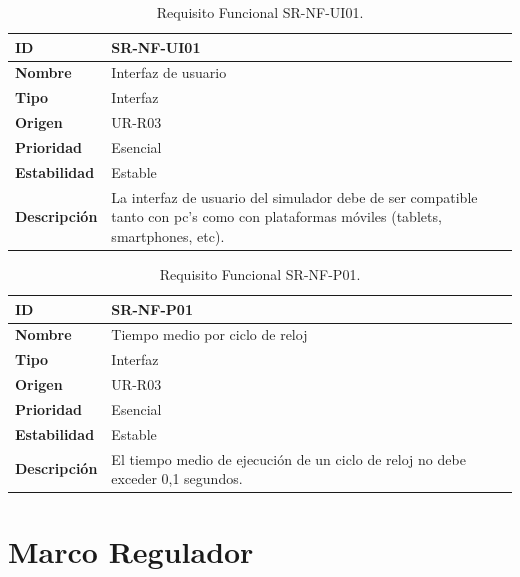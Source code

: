 \begin{center}
\begin{table}[htbp]
\centering
\begin{tabular}{@{}p{2.5cm} p{9cm}@{}} 
\toprule
\textbf{ID} 				& SR-NF-UI01 \\
\midrule
\textbf{Nombre} 			& Interfaz de usuario \\
\midrule
\textbf{Tipo} 			& Interfaz \\
\midrule
\textbf{Origen} 			& UR-R03 \\
\midrule
\textbf{Prioridad}		& Esencial \\
\midrule
\textbf{Estabilidad} 		& Estable \\
\midrule
\textbf{Descripción} 	& La interfaz de usuario del simulador debe de ser compatible tanto con pc's como con plataformas móviles (tablets, smartphones, etc). \\
\bottomrule
\end{tabular}
\caption{Requisito Funcional SR-NF-UI01.}
\label{tab:srnfui01}
\end{table}
\end{center}

\begin{center}
\begin{table}[htbp]
\centering
\begin{tabular}{@{}p{2.5cm} p{9cm}@{}} 
\toprule
\textbf{ID} 				& SR-NF-P01 \\
\midrule
\textbf{Nombre} 			& Tiempo medio por ciclo de reloj \\
\midrule
\textbf{Tipo} 			& Interfaz \\
\midrule
\textbf{Origen} 			& UR-R03 \\
\midrule
\textbf{Prioridad}		& Esencial \\
\midrule
\textbf{Estabilidad} 		& Estable \\
\midrule
\textbf{Descripción} 	& El tiempo medio de ejecución de un ciclo de reloj no debe exceder 0,1 segundos. \\
\bottomrule
\end{tabular}
\caption{Requisito Funcional SR-NF-P01.}
\label{tab:srnfp01}
\end{table}
\end{center}

\section{Marco Regulador}
\label{sec:regulatory_framework}

